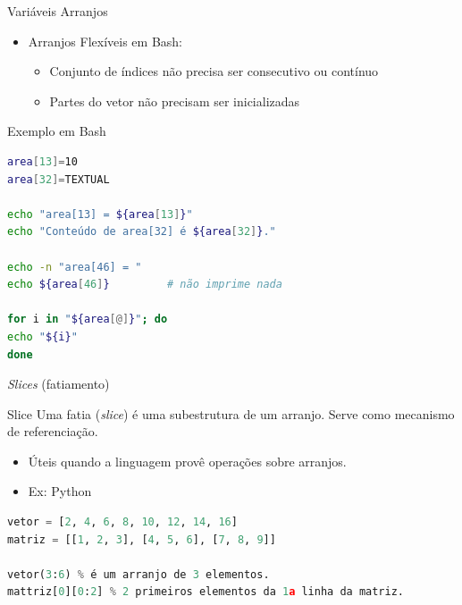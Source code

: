 \documentclass[handout]{beamer}
\begin{document}
\begin{frame}[fragile]{Variáveis Arranjos}
\begin{itemize}
\item Arranjos Flexíveis em Bash:
\begin{itemize}
\item Conjunto de índices não precisa ser consecutivo ou contínuo
\item Partes do vetor não precisam ser inicializadas
\end{itemize}
\end{itemize}

\begin{block}{Exemplo em Bash}
\begin{lstlisting}[language=Bash,numbers=none, basicstyle=\tiny]
area[13]=10
area[32]=TEXTUAL

echo "area[13] = ${area[13]}"
echo "Conteúdo de area[32] é ${area[32]}."

echo -n "area[46] = "
echo ${area[46]}         # não imprime nada

for i in "${area[@]}"; do
echo "${i}"
done
\end{lstlisting}
\end{block}
\end{frame}



\begin{frame}[fragile]{\textit{Slices} (fatiamento)}

\begin{block}{Slice}
    Uma fatia (\textit{slice}) é uma subestrutura de um arranjo. Serve como mecanismo de referenciação.
\end{block}

\begin{itemize}
    \item Úteis quando a linguagem provê operações sobre arranjos.
    \item Ex: Python
\end{itemize}
\begin{lstlisting}[language=Python,numbers=none]
vetor = [2, 4, 6, 8, 10, 12, 14, 16]
matriz = [[1, 2, 3], [4, 5, 6], [7, 8, 9]]

vetor(3:6) % é um arranjo de 3 elementos.
mattriz[0][0:2] % 2 primeiros elementos da 1a linha da matriz.

\end{lstlisting}
\end{frame}
\end{document}
